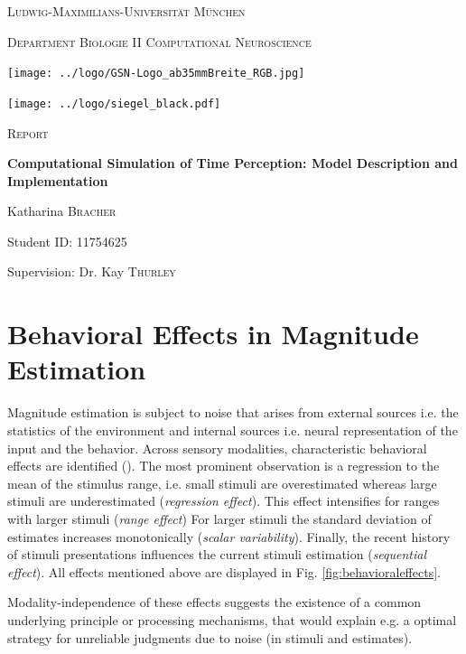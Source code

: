 \documentclass[9pt]{article}
\begin{document}
\begin{titlepage}
	\centering
	{\scshape\LARGE Ludwig-Maximilians-Universität München \par}
	{\scshape\large Department Biologie II Computational Neuroscience \par}
	\vspace{0.5cm}
	\texttt{[image: ../logo/GSN-Logo\_ab35mmBreite\_RGB.jpg]}\par
	\texttt{[image: ../logo/siegel\_black.pdf]}\par
	\vspace{0.7cm}
	{\scshape\LARGE Report \par}
	\vspace{0.05cm}
	{\huge\bfseries Computational Simulation of Time Perception: Model Description and Implementation \par}
	\vspace{1.1cm}
	{\Large Katharina \textsc{Bracher} \par}
	{Student ID: 11754625 \par}
	\vspace{0.4cm}
	{\large Supervision: Dr. Kay \textsc{Thurley} \par}
\end{titlepage}


\normalsize
\tableofcontents
\pagebreak


\section{Behavioral Effects in Magnitude Estimation}
Magnitude estimation is subject to noise that arises from external sources i.e. the statistics of the environment and internal sources i.e. neural representation of the input and the behavior.
Across sensory modalities, characteristic behavioral effects are identified (\cite{Petzschner2015}).
The most prominent observation is a regression to the mean of the stimulus range,  i.e. small stimuli are overestimated whereas large stimuli are underestimated (\textit{regression effect}). 
This effect intensifies for ranges with larger stimuli (\textit{range effect})
For larger stimuli the standard deviation of estimates increases monotonically (\textit{scalar variability}). 
Finally, the recent history of stimuli presentations influences the current stimuli estimation (\textit{sequential effect}).
All effects mentioned above are displayed in Fig. \ref{fig:behavioraleffects}. 

Modality-independence of these effects suggests the existence of a common underlying principle or processing mechanisms, that would explain e.g. a optimal strategy for unreliable judgments due to noise (in stimuli and estimates).
\end{document}
